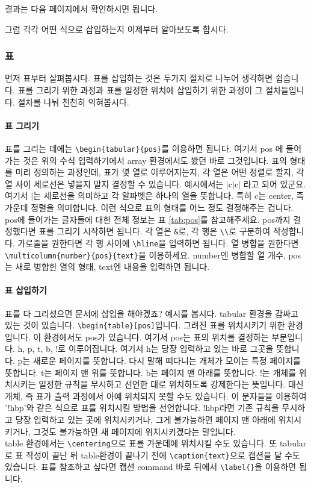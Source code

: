 결과는 다음 페이지에서 확인하시면 됩니다.



그럼 각각 어떤 식으로 삽입하는지 이제부터 알아보도록 합시다.

\subsubsection{표}
\label{subsec:mktab}
먼저 표부터 살펴봅시다.
표를 삽입하는 것은 두가지 절차로 나누어 생각하면 쉽습니다.
표를 그리기 위한 과정과 표를 일정한 위치에 삽입하기 위한 과정이 그 절차들입니다.
절차를 나눠 천천히 익혀봅시다.

\paragraph{표 그리기}
표를 그리는 데에는 \verb|\begin{tabular}{pos}|를 이용하면 됩니다.
여기서 pos 에 들어가는 것은 위의 수식 입력하기에서 array 환경에서도 봤던 바로 그것입니다.
표의 형태를 미리 정의하는 과정인데, 표가 몇 열로 이루어지는지, 각 열은 어떤 정렬로 할지, 각 열 사이 세로선은 넣을지 말지 결정할 수 있습니다. 예시에서는 $\mid$c$\mid$c$\mid$ 라고 되어 있군요.
여기서 $\mid$는 세로선을 의미하고 각 알파벳은 하나의 열을 뜻합니다.
특히 c는 center, 즉 가운데 정렬을 의미합니다.
이런 식으로 표의 형태를 어느 정도 결정해주는 겁니다.
pos에 들어가는 글자들에 대한 전체 정보는 표 \ref{tab:pos}를 참고해주세요.
pos까지 결정했다면 표를 그리기 시작하면 됩니다.
각 열은 \verb|&|로, 각 행은 \verb|\\|로 구분하여 작성합니다.
가로줄을 원한다면 각 행 사이에 \verb|\hline|을 입력하면 됩니다.
열 병합을 원한다면 \verb|\multicolumn{number}{pos}{text}|을 이용하세요.
number엔 병합할 열 개수, pos는 새로 병합한 열의 형태, text엔 내용을 입력하면 됩니다.

\paragraph{표 삽입하기}
표를 다 그리셨으면 문서에 삽입을 해야겠죠?
예시를 봅시다. tabular 환경을 감싸고 있는 것이 있습니다.
\verb|\begin{table}[pos]|입니다.
그려진 표를 위치시키기 위한 환경입니다.
이 환경에서도 pos가 있습니다.
여기서 pos는 표의 위치를 결정하는 부분입니다.
h, p, t, b, !로 이루어집니다.
여기서 h는 당장 입력하고 있는 바로 그곳을 뜻합니다.
p는 새로운 페이지를 뜻합니다. 다시 말해 떠다니는 개체가 모이는 특정 페이지를 뜻합니다.
t는 페이지 맨 위를 뜻합니다.
b는 페이지 맨 아래를 뜻합니다.
!는 개체를 위치시키는 일정한 규칙을 무시하고 선언한 대로 위치하도록 강제한다는 뜻입니다.
대신 개체, 즉 표가 출력 과정에서 아예 위치되지 못할 수도 있습니다.
이 문자들을 이용하여 '!hbp'와 같은 식으로 표를 위치시킬 방법을 선언합니다.
!hbp라면 기존 규칙을 무시하고 당장 입력하고 있는 곳에 위치시키거나, 그게 불가능하면 페이지 맨 아래에 위치시키거나, 그것도 불가능하면 새 페이지에 위치시키겠다는 말입니다.\\
table 환경에서는 \verb|\centering|으로 표를 가운데에 위치시킬 수도 있습니다.
또 tabular로 표 작성이 끝난 뒤 table환경이 끝나기 전에 \verb|\caption{text}|으로 캡션을 달 수도 있습니다.
표를 참조하고 싶다면 캡션 command 바로 뒤에서 \verb|\label{}|을 이용하면 됩니다.

